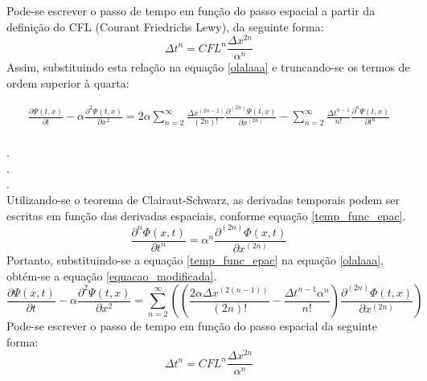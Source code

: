 \documentclass[10pt,twoside,a4paper]{article}
\begin{document}
Pode-se escrever o passo de tempo em função do passo espacial a partir da definição do CFL (Courant Friedrichs Lewy), da seguinte forma:
\begin{equation} \label{CFL}
\Delta t^n= CFL^n \frac{\Delta x^{2n}}{\alpha^{n}}
\end{equation}
Assim, substituindo esta relação na equação \ref{olalaaa} e truncando-se os termos de ordem superior à quarta:

\begin{equation}
\begin{split}
\frac{\partial \Psi \left(t, x\right) }{\partial t} -
\alpha \frac{\partial^2 \Psi \left(t, x\right) }{\partial x^2} 
= 
2 \alpha \sum\limits_{n=2}^{\infty} \frac{\Delta x^{\left(2n - 2\right)}}{\left(2n\right)!} \frac{\partial^{\left(2n\right)} \Psi \left(t, x\right)}{\partial x^{\left(2n\right)}}
- \sum\limits_{n=2}^{\infty} \frac{\Delta t^{n - 1}}{n!} \frac{\partial^{n} \Psi (t , x)}{\partial t^{n}}	
\end{split}
\end{equation}
\\
. \\ 
. \\
. \\
Utilizando-se o teorema de Clairaut-Schwarz, as derivadas temporais podem ser escritas em função das derivadas espaciais, conforme equação \ref{temp_func_epac}.
\begin{equation} \label{temp_func_epac}
\frac{\partial^{n} \Phi \left( x,t \right)}{\partial t^{n}} =  \alpha^{n} \frac{\partial^{\left(2n\right)} \Phi \left( x,t \right)}{\partial x^{\left(2n\right)}}
\end{equation}
Portanto, substituindo-se a equação \ref{temp_func_epac} na equação \ref{olalaaa}, obtém-se a equação \ref{equacao_modificada}.
\begin{equation} \label{equacao_modificada}
\frac{\partial \Psi \left( x,t \right)}{\partial t} - \alpha \frac{\partial^{2} \Psi \left(t, x\right)}{\partial x^{2}}= 
 \sum\limits_{n=2}^{\infty}\left( \left(\frac{ 2 \alpha \Delta x^{\left(2\left(n-1\right)\right)}}{\left(2n\right)!} -\frac{\Delta t^{n-1} \alpha^{n}}{n!}\right) \frac{\partial^{\left(2n\right)} \Phi \left(t, x\right)}{\partial x^{\left(2n\right)}}\right)
\end{equation}
Pode-se escrever o passo de tempo em função do passo espacial da seguinte forma:
\begin{equation} 
\Delta t^n= CFL^n \frac{\Delta x^{2n}}{\alpha^{n}}
\end{equation}
\end{document}
